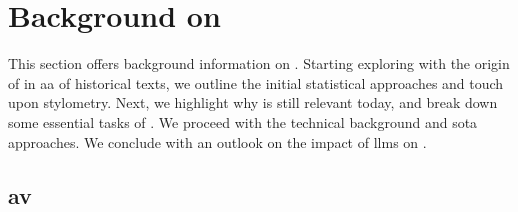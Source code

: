 \chapter{Background on \ai{}}
\label{chap:authorship_identification}

This section offers background information on \ai{}.
Starting exploring with the origin of \ai{} in \ac{aa} of historical texts, we outline the initial statistical approaches and touch upon stylometry.
Next, we highlight why \ai{} is still relevant today, and break down some essential tasks of \ai{}.
We proceed with the technical background and \ac{sota} approaches.
We conclude with an outlook on the impact of \acp{llm} on \ai{}.

















\section{\acl{av}}





